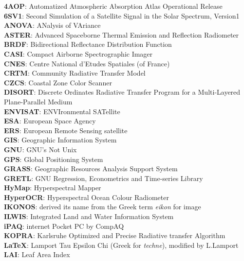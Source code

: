 \documentclass[10pt, a4paper]{article}
\begin{document}
\textbf{4AOP}: Automatized Atmospheric Absorption Atlas Operational Release \\
\textbf{6SV1}:  Second Simulation of a Satellite Signal in the Solar Spectrum, Version1\\
\textbf{ANOVA}: ANalysis of VAriance\\
\textbf{ASTER}: Advanced Spaceborne Thermal Emission and Reflection Radiometer\\
\textbf{BRDF}:  Bidirectional Reflectance Distribution Function\\
\textbf{CASI}:		Compact Airborne Spectrographic Imager\\
\textbf{CNES}: 		Centre National d'Etudes Spatiales (of France)\\
\textbf{CRTM}:		Community Radiative Transfer Model\\
\textbf{CZCS}:		 Coastal Zone Color Scanner\\
\textbf{DISORT}:	 Discrete Ordinates Radiative Transfer Program for a Multi-Layered Plane-Parallel Medium\\
\textbf{ENVISAT}:	ENVIronmental SATellite\\
\textbf{ESA}:		European Space Agency\\
\textbf{ERS}: 		European Remote Sensing satellite\\
\textbf{GIS}:		Geographic Information System\\
\textbf{GNU}:		GNU's Not Unix \\
\textbf{GPS}:		 Global Positioning System\\
\textbf{GRASS}:	 Geographic Resources Analysis Support System\\
\textbf{GRETL}:		GNU Regression, Econometrics and Time-series Library\\
\textbf{HyMap}:	Hyperspectral Mapper\\
\textbf{HyperOCR}:	Hyperspectral Ocean Colour Radiometer\\
\textbf{IKONOS}: 	derived its name from the Greek term \textit{eikon} for image\\
\textbf{ILWIS}:		Integrated Land and Water Information System\\
\textbf{iPAQ}:	internet Pocket PC by CompAQ\\
\textbf{KOPRA}:	 Karlsruhe Optimized and Precise Radiative transfer Algorithm\\
\textbf{LaTeX}:		Lamport Tau Epsilon Chi (Greek for \textit{techne}), modified by L.Lamport\\
\textbf{LAI}:	 Leaf Area Index\\
\end{document}
